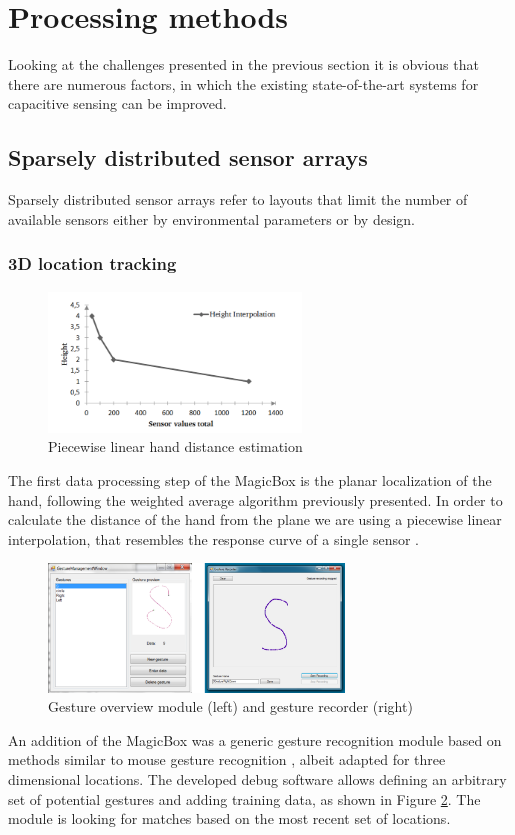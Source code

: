 \section{Processing methods}
Looking at the challenges presented in the previous section it is obvious that there are numerous factors, in which the existing state-of-the-art systems for capacitive sensing can be improved. 
\subsection{Sparsely distributed sensor arrays}
Sparsely distributed sensor arrays refer to layouts that limit the number of available sensors either by environmental parameters or by design. 
\subsubsection{3D location tracking}
 \begin{figure}[h]
\centering
\includegraphics[width=0.6\textwidth]{images/magicbox_data_zaxis}
\caption{Piecewise linear hand distance estimation \cite{Braun2011MultiInputDevice}}
\label{fig:magicbox_data_zaxis}
\end{figure}
The first data processing step of the MagicBox is the planar localization of the hand, following the weighted average algorithm previously presented. In order to calculate the distance of the hand from the plane we are using a piecewise linear interpolation, that resembles the response curve of a single sensor \cite{Braun2011MultiInputDevice}.
\begin{figure}[h]
\centering
\includegraphics[width=0.7\textwidth]{images/magicbox_data_gest}
\caption{Gesture overview module (left) and gesture recorder (right)}
\label{fig:magicbox_data_gest}
\end{figure}
An addition of the MagicBox was a generic gesture recognition module based on methods similar to mouse gesture recognition \cite{braun2013capacitive}, albeit adapted for three dimensional locations. The developed debug software allows defining an arbitrary set of potential gestures and adding training data, as shown in Figure \ref{fig:magicbox_data_gest}. The module is looking for matches based on the most recent set of locations. 
